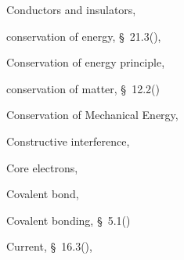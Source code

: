 \begin{multicols}{2}
{\begin{description}
	  \item[] \noindent\raggedright Conductors and insulators,  \pageref{id2409398}
	  
	  \item[] \noindent\raggedright conservation of energy,  \S~21.3(\pageref{m38786}),  \pageref{id2556212}
	  
	  \item[] \noindent\raggedright Conservation of energy principle,  \pageref{id2460317}
	  
	  \item[] \noindent\raggedright conservation of matter,  \S~12.2(\pageref{m38711})
	  
	  \item[] \noindent\raggedright Conservation of Mechanical Energy,  \pageref{id2556268}
	  
	  \item[] \noindent\raggedright Constructive interference,  \pageref{id2436281}
	  
	  \item[] \noindent\raggedright Core electrons,  \pageref{id2421542}
	  
	  \item[] \noindent\raggedright Covalent bond,  \pageref{id2427171}
	  
	  \item[] \noindent\raggedright Covalent bonding,  \S~5.1(\pageref{m38704})
	  
	  \item[] \noindent\raggedright Current,  \S~16.3(\pageref{m38773}),  \pageref{id2483239}
	  

\end{description}}
\end{multicols}

